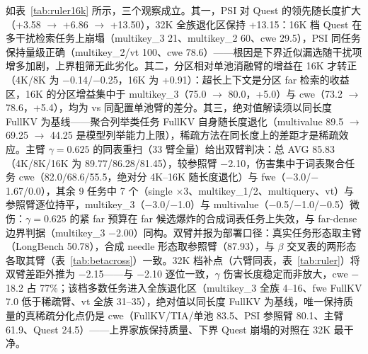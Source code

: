 \documentclass[11pt]{article}
\begin{document}
如表~\ref{tab:ruler16k} 所示，三个观察成立。其一，PSI 对 Quest 的领先随长度扩大（+3.58 $\rightarrow$ +6.86 $\rightarrow$ +13.50），32K 全族退化区保持 +13.15：16K 档 Quest 在多干扰检索任务上崩塌（multikey\_3 21、multikey\_2 60、cwe 29.5），PSI 同任务保持量级正确（multikey\_2/vt 100、cwe 78.6）——根因是下界近似漏选随干扰项增多加剧，上界粗筛无此劣化。其二，分区相对单池消融臂的增益在 16K 才转正（4K/8K 为 $-$0.14/$-$0.25，16K 为 +0.91）：超长上下文是分区 far 检索的收益区，16K 的分区增益集中于 multikey\_3（75.0 $\rightarrow$ 80.0，+5.0）与 cwe（73.2 $\rightarrow$ 78.6，+5.4），均为 vs 同配置单池臂的差分。其三，绝对值解读须以同长度 FullKV 为基线——聚合列举类任务 FullKV 自身随长度退化（multivalue 89.5 $\rightarrow$ 69.25 $\rightarrow$ 44.25 是模型列举能力上限），稀疏方法在同长度上的差距才是稀疏效应。主臂 $\gamma{=}0.625$ 的同表重扫（33 臂全量）给出双臂判决：总 AVG 85.83（4K/8K/16K 为 89.77/86.28/81.45），较参照臂 $-$2.10，伤害集中于词表聚合任务 cwe（82.0/68.6/55.5，绝对分 4K--16K 随长度退化）与 fwe（$-$3.0/$-$1.67/0.0），其余 9 任务中 7 个（single $\times$3、multikey\_1/2、multiquery、vt）与参照臂逐位持平，multikey\_3（$-$3.0/$-$1.0）与 multivalue（$-$0.5/$-$1.0/$-$0.5）微伤：$\gamma{=}0.625$ 的紧 far 预算在 far 候选爆炸的合成词表任务上失效，与 far-dense 边界判据（multikey\_3 $-$2.00）同构。双臂并报为部署口径：真实任务形态取主臂（LongBench 50.78），合成 needle 形态取参照臂（87.93），与 $\beta$ 交叉表的两形态各取其臂（表~\ref{tab:betacross}）一致。32K 档补点（六臂同表，表~\ref{tab:ruler}）将双臂差距外推为 $-$2.15——与 $-$2.10 逐位一致，$\gamma$ 伤害长度稳定而非放大，cwe $-$18.2 占 77\%；该档多数任务进入全族退化区（multikey\_3 全族 4--16、fwe FullKV 7.0 低于稀疏臂、vt 全族 31--35），绝对值以同长度 FullKV 为基线，唯一保持质量的真稀疏分化点仍是 cwe（FullKV/TIA/单池 83.5、PSI 参照臂 80.1、主臂 61.9、Quest 24.5）——上界家族保持质量、下界 Quest 崩塌的对照在 32K 最干净。
\end{document}
